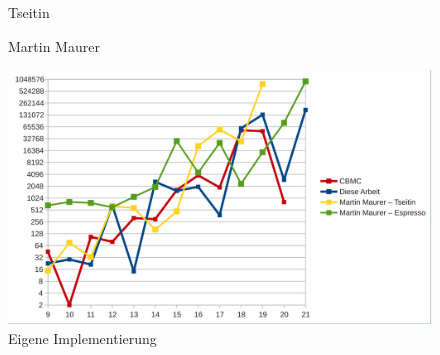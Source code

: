 \begin{figure}[!h]
\begin{minipage}[t]{0.45\textwidth}
  \begin{flushleft}Tseitin\end{flushleft}
  \end{minipage}
  \caption{Martin Maurer}
  \label{fig:eval_maurer}
\end{figure}

\begin{figure}[!h]
  \centering
  \includegraphics[scale=0.55]{images/eval_final}
  \caption{Eigene Implementierung}
  \label{fig:eval_final}
\end{figure}